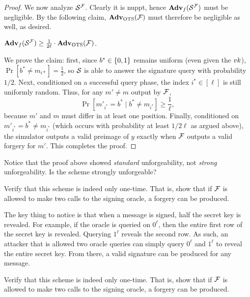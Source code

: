\documentclass[11pt]{article}
\begin{document}
\begin{proof}
  We now analyze $\mathcal{S}^{\mathcal{F}}$.  Clearly it is nuppt, hence
  $\mathbf{Adv}_{f}(\mathcal{S}^{\mathcal{F}})$ must be negligible.  By the following
  claim, $\mathbf{Adv}_{\text{OTS}}(\mathcal{F})$ must therefore be negligible as well,
  as desired.

  \begin{claim}
    $\mathbf{Adv}_{f}(\mathcal{S}^{\mathcal{F}}) \geq \frac{1}{2\ell} \cdot
    \mathbf{Adv}_{\text{OTS}}(\mathcal{F})$.
  \end{claim}

  We prove the claim: first, since $b^* \in \{0,1\}$ remains uniform
  (even given the $vk$), $\Pr[b^* \neq m_{i*}] = \frac{1}{2}$, so
  $\mathcal{S}$ is able to answer the signature query with probability $1/2$.
  Next, conditioned on a successful query phase, the index $i^{*} \in
  [\ell]$ is still uniformly random.  Thus, for any $m' \neq m$ output
  by $\mathcal{F}$, \[ \Pr[m'_{i^*} = b^{*} \mid b^* \neq m_{i^{*}} ] \geq
  \frac{1}{\ell}, \] because $m'$ and $m$ must differ in at least one
  position.  Finally, conditioned on $m'_{i^{*}} = b^{*} \neq
  m_{i^{*}}$ (which occurs with probability at least $1/2\ell$ as
  argued above), the simulator outputs a valid preimage of $y$ exactly
  when $\mathcal{F}$ outputs a valid forgery for $m'$.  This completes the
  proof.
\end{proof}

\begin{remark}
  Notice that the proof above showed \emph{standard} unforgeability,
  not \emph{strong} unforgeability.  Is the scheme strongly
  unforgeable?
\end{remark}
\begin{question}
    Verify that this scheme is indeed only one-time. That is, show that if \(\mathcal{F}\) is
    allowed to make two calls to the signing oracle, a forgery can be produced.
\end{question}
\begin{answer}
    The key thing to notice is that when a message is signed, half the secret key is
    revealed. For example, if the oracle is queried on \(0^\ell\), then the entire first
    row of the secret key is revealed. Querying \(1^\ell\) reveals the second row. As
    such, an attacker that is allowed two oracle queries can simply query \(0^\ell\) and
    \(1^\ell\) to reveal the entire secret key. From there, a valid signature can be
    produced for any message.
\end{answer}

\begin{question}
  Verify that this scheme is indeed only one-time. That is, show that
  if \(\mathcal{F}\) is allowed to make two calls to the signing oracle, a
  forgery can be produced.
\end{question}
\end{document}
